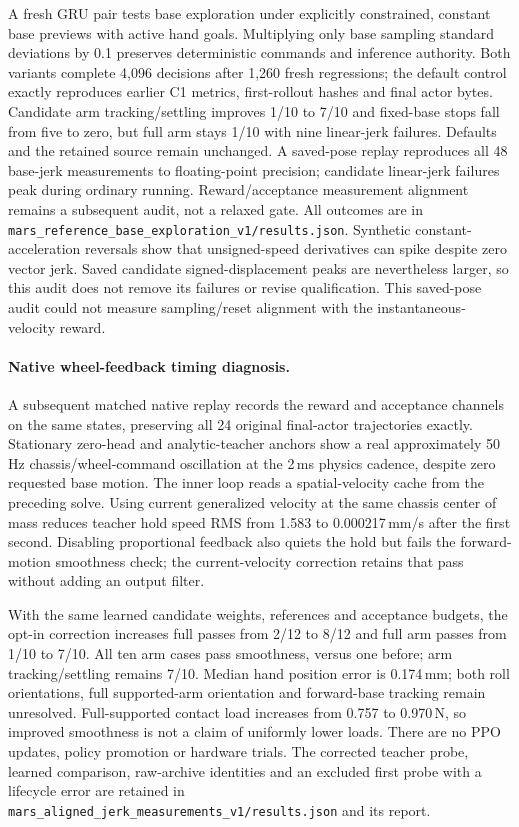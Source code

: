 A fresh GRU pair tests base exploration under explicitly constrained, constant
base previews with active hand goals. Multiplying only base sampling standard
deviations by 0.1 preserves deterministic commands and inference authority.
Both variants complete 4,096 decisions after 1,260 fresh regressions; the default
control exactly reproduces earlier C1 metrics, first-rollout hashes and final
actor bytes. Candidate arm tracking/settling improves 1/10 to 7/10 and fixed-base
stops fall from five to zero, but full arm stays 1/10 with nine linear-jerk
failures. Defaults and the retained source remain unchanged. A saved-pose replay
reproduces all 48 base-jerk measurements to floating-point precision; candidate
linear-jerk failures peak during ordinary running. Reward/acceptance measurement
alignment remains a subsequent audit, not a relaxed gate. All outcomes are in
\texttt{mars\_reference\_base\_exploration\_v1/results.json}.
Synthetic constant-acceleration reversals show that unsigned-speed derivatives
can spike despite zero vector jerk. Saved candidate signed-displacement peaks
are nevertheless larger, so this audit does not remove its failures or revise
qualification. This saved-pose audit could not measure sampling/reset alignment
with the instantaneous-velocity reward.

\paragraph{Native wheel-feedback timing diagnosis.}
A subsequent matched native replay records the reward and acceptance channels
on the same states, preserving all 24 original final-actor trajectories exactly.
Stationary zero-head and analytic-teacher anchors show a real approximately
50\,Hz chassis/wheel-command oscillation at the 2\,ms physics cadence, despite
zero requested base motion. The inner loop reads a spatial-velocity cache from
the preceding solve. Using current generalized velocity at the same chassis
center of mass reduces teacher hold speed RMS from 1.583 to 0.000217\,mm/s
after the first second. Disabling proportional feedback also quiets the hold
but fails the forward-motion smoothness check; the current-velocity correction
retains that pass without adding an output filter.

With the same learned candidate weights, references and acceptance budgets,
the opt-in correction increases full passes from 2/12 to 8/12 and full arm
passes from 1/10 to 7/10. All ten arm cases pass smoothness, versus one before;
arm tracking/settling remains 7/10. Median hand position error is 0.174\,mm;
both roll orientations, full supported-arm orientation and forward-base
tracking remain unresolved. Full-supported contact load increases from 0.757
to 0.970\,N, so improved smoothness is not a claim of uniformly lower loads.
There are no PPO updates, policy promotion or hardware trials. The corrected
teacher probe, learned comparison, raw-archive identities and an excluded
first probe with a lifecycle error are retained in
\texttt{mars\_aligned\_jerk\_measurements\_v1/results.json} and its report.

